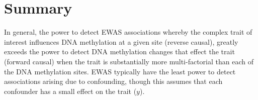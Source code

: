 \documentclass[
]{article}
\begin{document}
\hypertarget{summary}{%
\section{Summary}\label{summary}}

In general, the power to detect EWAS associations whereby the complex trait of interest influences DNA methylation at a given site (reverse causal), greatly exceeds the power to detect DNA methylation changes that effect the trait (forward causal) when the trait is substantially more multi-factorial than each of the DNA methylation sites. EWAS typically have the least power to detect associations arising due to confounding, though this assumes that each confounder has a small effect on the trait (\(y\)).
\end{document}
